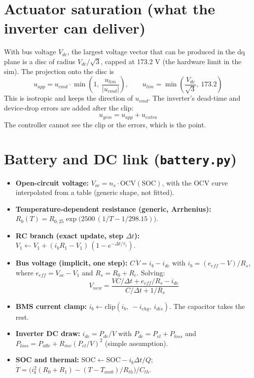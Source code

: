 \documentclass[11pt]{article}
\begin{document}
\section{Actuator saturation (what the inverter can deliver)}
With bus voltage $V_{dc}$, the largest voltage vector that can be produced in the dq plane is a disc of radius $V_{dc}/\sqrt{3}$, capped at 173.2 V (the hardware limit in the sim). The projection onto the disc is
\begin{equation}
u_{app} = u_{cmd}\cdot \min\!\left(1,\ \frac{u_{lim}}{|u_{cmd}|}\right), \qquad u_{lim} = \min\!\left(\frac{V_{dc}}{\sqrt{3}},\ 173.2\right)
\end{equation}
This is isotropic and keeps the direction of $u_{cmd}$. The inverter's dead-time and device-drop errors are added after the clip:
\begin{equation}
u_{gem} = u_{app} + u_{extra}
\end{equation}
The controller cannot see the clip or the errors, which is the point.

\section{Battery and DC link (\texttt{battery.py})}
\begin{itemize}
\item \textbf{Open-circuit voltage:} $V_{oc} = n_s \cdot \mathrm{OCV}(\text{SOC})$, with the OCV curve interpolated from a table (generic shape, not fitted).
\item \textbf{Temperature-dependent resistance (generic, Arrhenius):} $R_0(T) = R_{0,25}\exp\!\big(2500\,(1/T - 1/298.15)\big)$.
\item \textbf{RC branch (exact update, step $\Delta t$):} $V_1 \leftarrow V_1 + (i_b R_1 - V_1)\,(1 - e^{-\Delta t/\tau_1})$.
\item \textbf{Bus voltage (implicit, one step):} $C\,\dot V = i_b - i_{dc}$ with $i_b = (e_{eff} - V)/R_s$, where $e_{eff} = V_{oc} - V_1$ and $R_s = R_0 + R_c$. Solving:
\begin{equation}
V_{new} = \frac{V C/\Delta t + e_{eff}/R_s - i_{dc}}{C/\Delta t + 1/R_s}
\end{equation}
\item \textbf{BMS current clamp:} $i_b \leftarrow \mathrm{clip}(i_b,\ -i_{chg},\ i_{dis})$. The capacitor takes the rest.
\item \textbf{Inverter DC draw:} $i_{dc} = P_{dc}/V$ with $P_{dc} = P_{el} + P_{loss}$ and $P_{loss} = P_{idle} + R_{inv}(P_{el}/V)^2$ (simple assumption).
\item \textbf{SOC and thermal:} $\mathrm{SOC} \leftarrow \mathrm{SOC} - i_b\Delta t/Q$; $\dot T = \big(i_b^2(R_0 + R_1) - (T - T_{amb})/R_{th}\big)/C_{th}$.
\end{itemize}
\end{document}
